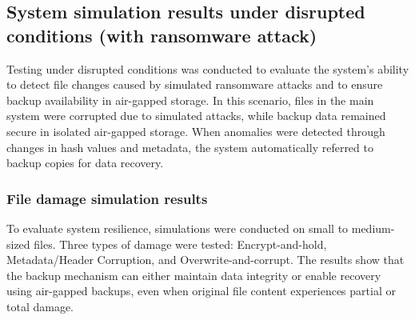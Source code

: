 \documentclass{iaesarticle}
\begin{document}
\subsection{System simulation results under disrupted conditions (with ransomware attack)}
Testing under disrupted conditions was conducted to evaluate the system's ability to detect file changes caused by simulated ransomware attacks and to ensure backup availability in air-gapped storage. In this scenario, files in the main system were corrupted due to simulated attacks, while backup data remained secure in isolated air-gapped storage. When anomalies were detected through changes in hash values and metadata, the system automatically referred to backup copies for data recovery.

\subsubsection{File damage simulation results}
To evaluate system resilience, simulations were conducted on small to medium-sized files. Three types of damage were tested: Encrypt-and-hold, Metadata/Header Corruption, and Overwrite-and-corrupt. The results show that the backup mechanism can either maintain data integrity or enable recovery using air-gapped backups, even when original file content experiences partial or total damage.
\end{document}
